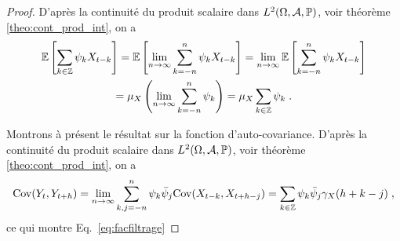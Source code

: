 \begin{proof}
D'apr\`es la continuit\'e du produit scalaire dans $L^2(\Omega,\mathcal{A},\mathbb{P})$, voir th\'eor\`eme \ref{theo:cont_prod_int}, on a
\begin{multline*}
{\mathbb E}\left[ \sum_{k\in\mathbb{Z}}\psi_k X_{t-k} \right]={\mathbb E}\left[ \lim_{n\to\infty}\sum_{k=-n}^n \psi_k X_{t-k} \right]
=\lim_{n\to\infty}{\mathbb E}\left[ \sum_{k=-n}^n \psi_k X_{t-k} \right]\\
=\mu_X \left(\lim_{n\to\infty}\sum_{k=-n}^n \psi_k \right)
=\mu_X \sum_{k\in\mathbb{Z}} \psi_k\; .
\end{multline*}

Montrons \`a pr\'esent le r\'esultat sur la fonction d'auto-covariance.
D'apr\`es la continuit\'e du produit scalaire dans $L^2(\Omega,\mathcal{A},\mathbb{P})$, voir th\'eor\`eme \ref{theo:cont_prod_int}, on a
\begin{equation*}
\mathrm{Cov}(Y_t,Y_{t+h}) =\lim_{n\to\infty}\sum_{k,j=-n}^n\psi_k \bar{\psi}_j\mathrm{Cov}(X_{t-k},X_{t+h-j})
= \sum_{k\in\mathbb{Z}}\psi_k \bar{\psi}_j\gamma_X(h+k-j)\; ,
\end{equation*}
ce qui montre Eq.~\eqref{eq:facfiltrage}


\end{proof}
